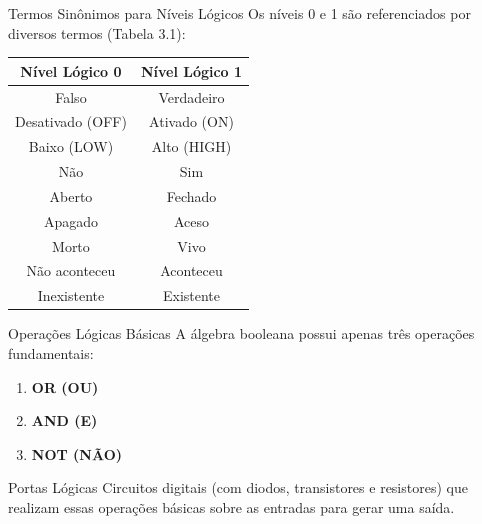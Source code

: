 \begin{frame}{Termos Sinônimos para Níveis Lógicos}
    Os níveis 0 e 1 são referenciados por diversos termos (Tabela 3.1):
    \vspace{0.2cm}
    \begin{table}
        \small
        \centering
        \begin{tabular}{cc}
            \hline
            \textbf{Nível Lógico 0} & \textbf{Nível Lógico 1} \\ \hline
            Falso                   & Verdadeiro              \\
            Desativado (OFF)        & Ativado (ON)            \\
            Baixo (LOW)             & Alto (HIGH)             \\
            Não                     & Sim                     \\
            Aberto                  & Fechado                 \\
            Apagado                 & Aceso                   \\
            Morto                   & Vivo                    \\
            Não aconteceu           & Aconteceu               \\
            Inexistente             & Existente               \\ \hline
        \end{tabular}
    \end{table}
\end{frame}


\begin{frame}{Operações Lógicas Básicas}
    A álgebra booleana possui apenas três operações fundamentais:
    \vspace{0.4cm}
    \begin{enumerate}
        \item \textbf{OR (OU)}
        \item \textbf{AND (E)}
        \item \textbf{NOT (NÃO)}
    \end{enumerate}
    \vspace{0.4cm}
    \begin{block}{Portas Lógicas}
        Circuitos digitais (com diodos, transistores e resistores) que realizam essas operações básicas sobre as entradas para gerar uma saída.
    \end{block}
\end{frame}

